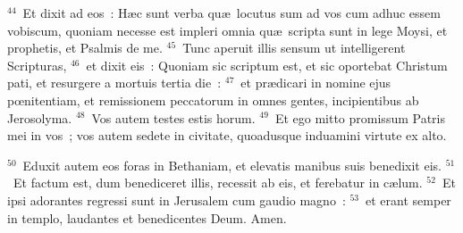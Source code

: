 ${}^{44}$~Et dixit ad eos~: H\ae c sunt verba qu\ae\ locutus sum ad vos cum adhuc essem vobiscum, quoniam necesse est impleri omnia qu\ae\ scripta sunt in lege Moysi, et prophetis, et Psalmis de me.
${}^{45}$~Tunc aperuit illis sensum ut intelligerent Scripturas,
${}^{46}$~et dixit eis~: Quoniam sic scriptum est, et sic oportebat Christum pati, et resurgere a mortuis tertia die~:
${}^{47}$~et pr\ae dicari in nomine ejus pœnitentiam, et remissionem peccatorum in omnes gentes, incipientibus ab Jerosolyma.
${}^{48}$~Vos autem testes estis horum.
${}^{49}$~Et ego mitto promissum Patris mei in vos~; vos autem sedete in civitate, quoadusque induamini virtute ex alto.


${}^{50}$~Eduxit autem eos foras in Bethaniam, et elevatis manibus suis benedixit eis.
${}^{51}$~Et factum est, dum benediceret illis, recessit ab eis, et ferebatur in c\ae lum.
${}^{52}$~Et ipsi adorantes regressi sunt in Jerusalem cum gaudio magno~:
${}^{53}$~et erant semper in templo, laudantes et benedicentes Deum. Amen.
